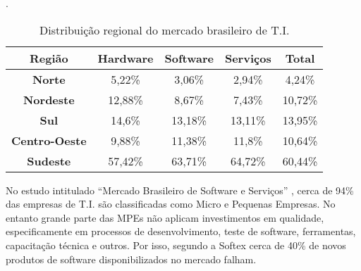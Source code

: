 \begin{table}[H]
\centering
\caption{Distribuição regional do mercado brasileiro de T.I. \cite{abes-software2016}}.
\label{tab:1.1}
\begin{tabular}{|c|c|c|c|c|}
\hline
\textbf{Região}       & \textbf{Hardware} & \textbf{Software} & \textbf{Serviços} & \textbf{Total} 
    \\ \hline
\textbf{Norte}        & 5,22\%            & 3,06\%            & 2,94\%            & 4,24\%         
    \\ \hline
\textbf{Nordeste}     & 12,88\%           & 8,67\%            & 7,43\%            & 10,72\%        
    \\ \hline
\textbf{Sul}          & 14,6\%            & 13,18\%           & 13,11\%           & 13,95\%          
    \\ \hline
\textbf{Centro-Oeste} & 9,88\%            & 11,38\%           & 11,8\%            & 10,64\%        
    \\ \hline
\textbf{Sudeste}      & 57,42\%           & 63,71\%           & 64,72\%           & 60,44\%        
    \\ \hline
\end{tabular}
\end{table}

No estudo intitulado “Mercado Brasileiro de Software e Serviços” \cite{abes-software2016}, cerca de 94\% das empresas de T.I. são classificadas como Micro e Pequenas Empresas. No entanto grande parte das MPEs não aplicam investimentos em qualidade, especificamente em processos de desenvolvimento, teste de software, ferramentas, capacitação técnica e outros. Por isso, segundo a Softex \cite{GuiaMPTbr} cerca de 40\% de novos produtos de software disponibilizados no mercado falham.

